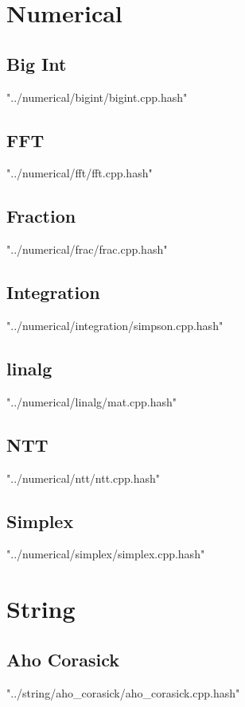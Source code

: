 \documentclass [a4paper,5pt,oneside, landscape]{article}
\begin{document}
\begin{multicols}{3}
\section{Numerical}
\subsection{ Big Int}
 {"../numerical/bigint/bigint.cpp.hash"}


\subsection{ FFT}
 {"../numerical/fft/fft.cpp.hash"}


\subsection{ Fraction}
 {"../numerical/frac/frac.cpp.hash"}


\subsection{ Integration}
 {"../numerical/integration/simpson.cpp.hash"}


\subsection{ linalg}
 {"../numerical/linalg/mat.cpp.hash"}


\subsection{ NTT}
 {"../numerical/ntt/ntt.cpp.hash"}


\subsection{ Simplex}
 {"../numerical/simplex/simplex.cpp.hash"}



\section{String}
\subsection{ Aho Corasick}
 {"../string/aho_corasick/aho_corasick.cpp.hash"}



\end{multicols}
\end{document}
